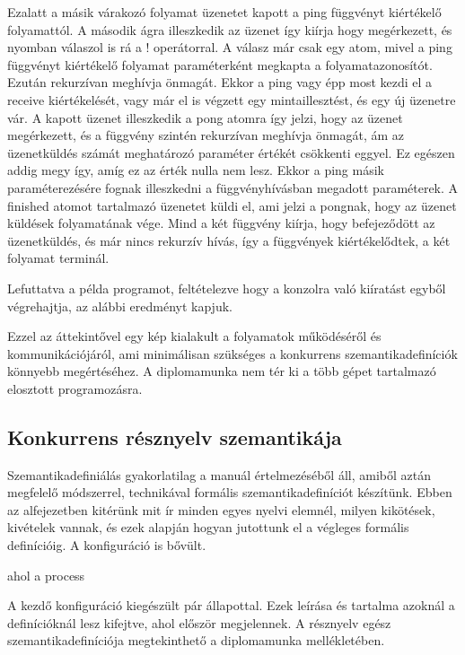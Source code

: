 Ezalatt a másik várakozó folyamat üzenetet kapott a ping függvényt kiértékelő folyamattól. A második ágra illeszkedik az üzenet így kiírja hogy megérkezett, és nyomban válaszol is rá a ! operátorral. A válasz már csak egy atom, mivel a ping függvényt kiértékelő folyamat paraméterként megkapta a folyamatazonosítót. Ezután rekurzívan meghívja önmagát. Ekkor a ping vagy épp most kezdi el a receive kiértékelését, vagy már el is végzett egy mintaillesztést, és egy új üzenetre vár. A kapott üzenet illeszkedik a pong atomra így jelzi, hogy az üzenet megérkezett, és a függvény szintén rekurzívan meghívja önmagát, ám az üzenetküldés számát meghatározó paraméter értékét csökkenti eggyel. Ez egészen addig megy így, amíg ez az érték nulla nem lesz. Ekkor a ping másik paraméterezésére fognak illeszkedni a függvényhívásban megadott paraméterek. A finished atomot tartalmazó üzenetet küldi el, ami jelzi a pongnak, hogy az üzenet küldések folyamatának vége. Mind a két függvény kiírja, hogy befejeződött az üzenetküldés, és már nincs rekurzív hívás, így a függvények kiértékelődtek, a két folyamat terminál.

Lefuttatva a példa programot, feltételezve hogy a konzolra való kiíratást egyből végrehajtja, az alábbi eredményt kapjuk.



Ezzel az áttekintővel egy kép kialakult a folyamatok működéséről és kommunikációjáról, ami minimálisan szükséges a konkurrens szemantikadefiníciók könnyebb megértéséhez. A diplomamunka nem tér ki a több gépet tartalmazó elosztott programozásra.

\subsection{Konkurrens résznyelv szemantikája}

Szemantikadefiniálás gyakorlatilag a manuál értelmezéséből áll, amiből aztán megfelelő módszerrel, technikával formális szemantikadefiníciót készítünk. Ebben az alfejezetben kitérünk mit ír minden egyes nyelvi elemnél, milyen kikötések, kivételek vannak, és ezek alapján hogyan jutottunk el a végleges formális definícióig. A konfiguráció is bővült.




ahol a process



A kezdő konfiguráció kiegészült pár állapottal. Ezek leírása és tartalma azoknál a definícióknál lesz kifejtve, ahol először megjelennek. A résznyelv egész szemantikadefiníciója megtekinthető a diplomamunka mellékletében.%

